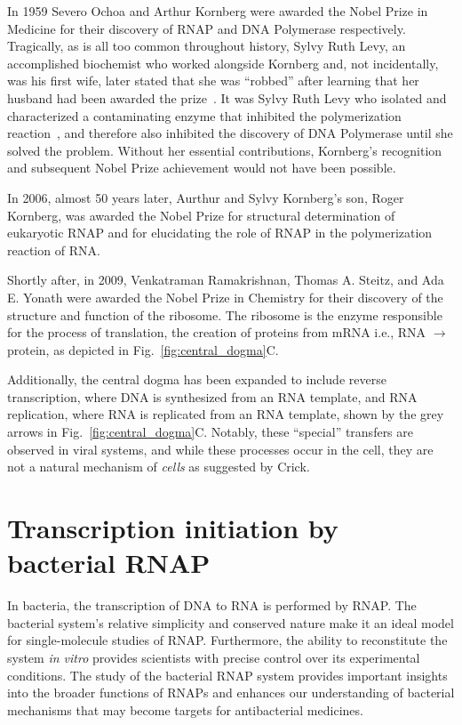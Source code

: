 In 1959 Severo Ochoa and Arthur Kornberg were awarded the Nobel Prize in Medicine for their discovery of \ac{RNAP} and DNA Polymerase respectively. 
Tragically, as is all too common throughout history, Sylvy Ruth Levy, an accomplished biochemist who worked alongside Kornberg and, not incidentally, was his first wife, later stated that she was \enquote{robbed} after learning that her husband had been awarded the prize~\cite{lenzer_2008}. 
It was Sylvy Ruth Levy who isolated and characterized a contaminating enzyme that inhibited the polymerization reaction~\cite{kornberg_enzymatic_1958}, and therefore also inhibited the discovery of DNA Polymerase until she solved the problem.
Without her essential contributions, Kornberg's recognition and subsequent Nobel Prize achievement would not have been possible.

In 2006, almost 50 years later, Aurthur and Sylvy Kornberg's son, Roger Kornberg, was awarded the Nobel Prize for structural determination of eukaryotic RNAP and for elucidating the role of RNAP in the polymerization reaction of RNA. 

Shortly after, in 2009, Venkatraman Ramakrishnan, Thomas A. Steitz, and Ada E. Yonath were awarded the Nobel Prize in Chemistry for their discovery of the structure and function of the ribosome. 
The ribosome is the enzyme responsible for the process of translation, the creation of proteins from \ac{mRNA} i.e., RNA $\rightarrow$ protein, as depicted in
Fig.~\ref{fig:central_dogma}C. 
 
Additionally, the central dogma has been expanded to include reverse transcription, where DNA is synthesized from an RNA template, and RNA replication, where RNA is replicated from an RNA template, shown by the grey arrows in Fig.~\ref{fig:central_dogma}C.
Notably, these \enquote{special} transfers are observed in viral systems, and while these processes occur in the cell, they are not a natural mechanism of \textit{cells} as suggested by Crick.

\section{Transcription initiation by bacterial RNAP}
\label{sec:transcription_initiation}

In bacteria, the transcription of DNA to RNA is performed by RNAP. 
The bacterial system's relative simplicity and conserved nature make it an ideal model for single-molecule studies of RNAP. 
Furthermore, the ability to reconstitute the system \textit{in vitro} provides scientists with precise control over its experimental conditions.
The study of the bacterial RNAP system provides important insights into the broader functions of RNAPs and enhances our understanding of bacterial mechanisms that may become targets for antibacterial medicines.


